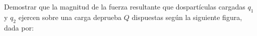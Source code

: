\documentclass[preview]{standalone}
\begin{document}
\begin{flushleft}
Demostrar que la magnitud de la fuerza resultante que dospartículas cargadas $q_1$ y $q_2$ ejercen sobre una carga deprueba $Q$ dispuestas según la siguiente figura, dada por:
\end{flushleft}
\end{document}
